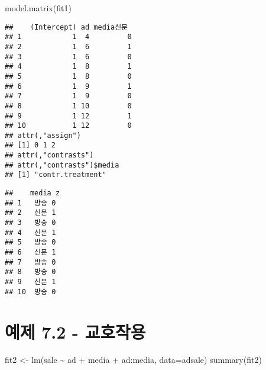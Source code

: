 \documentclass[
]{book}
\newenvironment{Shaded}{\begin{snugshade}}{\end{snugshade}}
\newcommand{\AttributeTok}[1]{\textcolor[rgb]{0.77,0.63,0.00}{#1}}
\newcommand{\DecValTok}[1]{\textcolor[rgb]{0.00,0.00,0.81}{#1}}
\newcommand{\FunctionTok}[1]{\textcolor[rgb]{0.00,0.00,0.00}{#1}}
\newcommand{\NormalTok}[1]{#1}
\newcommand{\OtherTok}[1]{\textcolor[rgb]{0.56,0.35,0.01}{#1}}
\newcommand{\SpecialCharTok}[1]{\textcolor[rgb]{0.00,0.00,0.00}{#1}}
\begin{document}
\begin{Shaded}
\begin{Highlighting}[]
\FunctionTok{model.matrix}\NormalTok{(fit1)}
\end{Highlighting}
\end{Shaded}

\begin{verbatim}
##    (Intercept) ad media신문
## 1            1  4         0
## 2            1  6         1
## 3            1  6         0
## 4            1  8         1
## 5            1  8         0
## 6            1  9         1
## 7            1  9         0
## 8            1 10         0
## 9            1 12         1
## 10           1 12         0
## attr(,"assign")
## [1] 0 1 2
## attr(,"contrasts")
## attr(,"contrasts")$media
## [1] "contr.treatment"
\end{verbatim}

\begin{Shaded}
\end{Shaded}

\begin{verbatim}
##    media z
## 1   방송 0
## 2   신문 1
## 3   방송 0
## 4   신문 1
## 5   방송 0
## 6   신문 1
## 7   방송 0
## 8   방송 0
## 9   신문 1
## 10  방송 0
\end{verbatim}

\hypertarget{uxc608uxc81c-7.2---uxad50uxd638uxc791uxc6a9}{%
\section{예제 7.2 - 교호작용}\label{uxc608uxc81c-7.2---uxad50uxd638uxc791uxc6a9}}

\begin{Shaded}
\begin{Highlighting}[]
\NormalTok{fit2 }\OtherTok{\textless{}{-}} \FunctionTok{lm}\NormalTok{(sale }\SpecialCharTok{\textasciitilde{}}\NormalTok{ ad }\SpecialCharTok{+}\NormalTok{ media }\SpecialCharTok{+}\NormalTok{ ad}\SpecialCharTok{:}\NormalTok{media, }\AttributeTok{data=}\NormalTok{adsale)}
\FunctionTok{summary}\NormalTok{(fit2)}
\end{Highlighting}
\end{Shaded}
\end{document}
